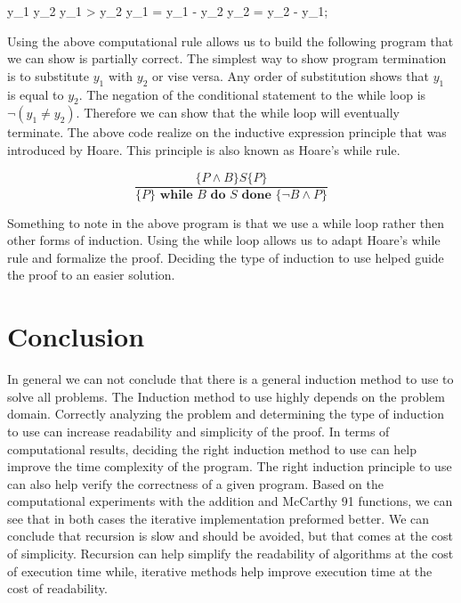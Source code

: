 \documentclass{article}
\begin{document}
\begin{program} 
\WHILE y_1 \neq y_2 \DO 
	\IF y_1 > y_2 \THEN y_1 = y_1 - y_2 \ELSE y_2 = y_2 - y_1; 
\end{program}

Using the above computational rule allows us to build the following program that we can show is partially correct. The simplest way to show program termination is to substitute $y_1$ with $y_2$ or vise versa. Any order of substitution shows that $y_1$ is equal to  $y_2$. The negation of the conditional statement to the while loop is $\neg(y_1 \neq y_2)$. Therefore we can show that the while loop will eventually terminate. The above code realize on the inductive expression principle that was introduced by Hoare. This principle is also known as Hoare's while rule. 

\[
 \frac{\{P \wedge B\} S\{P\}}{\{P\}\textbf{ while } B \textbf{ do } S \textbf{ done } \{\neg B \wedge P\}}
\]

Something to note in the above program is that we use a while loop rather then other forms of induction. Using the while loop allows us to adapt Hoare's while rule and formalize the proof. Deciding the type of induction to use helped guide the proof to an easier solution. 


\section{Conclusion}
In general we can not conclude that there is a general induction method to use to solve all problems. The Induction method to use highly depends on the problem domain. Correctly analyzing the problem and determining the type of induction to use can increase readability and simplicity of the proof. In terms of computational results, deciding the right induction method to use can help improve the time complexity of the program. The right induction principle to use can also help verify the correctness of a given program. Based on the computational experiments with the addition and McCarthy 91 functions, we can see that in both cases the iterative implementation preformed better. We can conclude that recursion is slow and should be avoided, but that comes at the cost of simplicity. Recursion can help simplify the readability of algorithms at the cost of execution time while, iterative methods help improve execution time at the cost of readability. 
\end{document}

